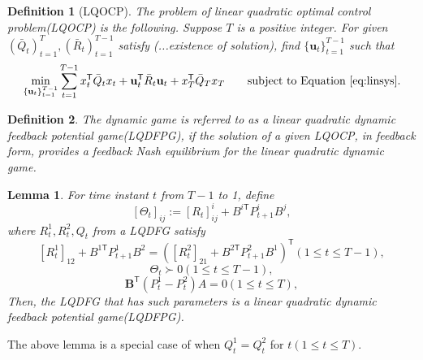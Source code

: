 \documentclass{article}
\newcommand{\transpose}{\mathsf{T}}
\newtheorem{lemma}{Lemma}
\newtheorem{definition}{Definition}
\begin{document}
\begin{definition}[LQOCP]\label{def:LQOCP}
    The problem of linear quadratic optimal control problem(LQOCP) is the following.
    Suppose $T$ is a positive integer. For given $(\bar{Q}_{t})_{t=1}^{T},(\bar{R}_{t})_{t=1}^{T-1}$ satisfy (...existence of solution), find $\{\mathbf{u}_{t}\}_{t=1}^{T-1}$ such that
    \begin{equation}\label{eq:LQOCP}
\begin{split}
    \min_{\{\mathbf{u}_{t}\}_{t=1}^{T-1}} \sum_{t=1}^{T-1} x_{t}^{\transpose}\bar{Q}_{t}x_{t} + \mathbf{u}_{t}^{\transpose}\bar{R}_{t}\mathbf{u}_{t} + x_{T}^{\transpose}\bar{Q}_{T}x_{T} \text{\qquad subject to Equation \eqref{eq:linsys}}.
\end{split}
\end{equation}
\end{definition}



\begin{definition}
    The dynamic game is referred to as a linear quadratic dynamic feedback potential game(LQDFPG), if the solution of a given LQOCP, in feedback form, provides a feedback Nash equilibrium for the linear quadratic dynamic game. 
\end{definition}

\begin{lemma}
    For time instant $t$ from $T-1$ to 1, define
        \begin{equation}\label{eq:Theta}
        [\Theta_{t}]_{ij} := [R_{t}]^{i}_{ij} + B^{i\transpose}P_{t+1}^{i}B^{j},
        \end{equation}
    where $R_{t}^{1},R_{t}^{2},Q_{t}$ from a LQDFG satisfy
        \begin{equation}\label{eq:costFPDG1}
            [R_{t}^{1}]_{12} + B^{1\transpose}P_{t+1}^{1}B^{2} = ([R_{t}^{2}]_{21} + B^{2\transpose}P_{t+1}^{2}B^{1})^{\transpose}(1\leq t\leq T-1),
        \end{equation}
        \begin{equation}\label{eq:costFPDG2}
            \Theta_{t} \succ 0(1\leq t \leq T-1),
        \end{equation}
        \begin{equation}\label{eq:costFPDG3}
            \mathbf{B}^{\transpose}(P_{t}^{1}-P_{t}^{2})A=0(1\leq t \leq T),
        \end{equation}
    Then, the LQDFG that has such parameters is a linear quadratic dynamic feedback potential game(LQDFPG).
\end{lemma}
The above lemma is a special case of \cite[Theorem 6]{prasad_structure_2023} when $Q_{t}^{1}=Q_{t}^{2}$ for $t(1\leq t \leq T)$.
\end{document}
